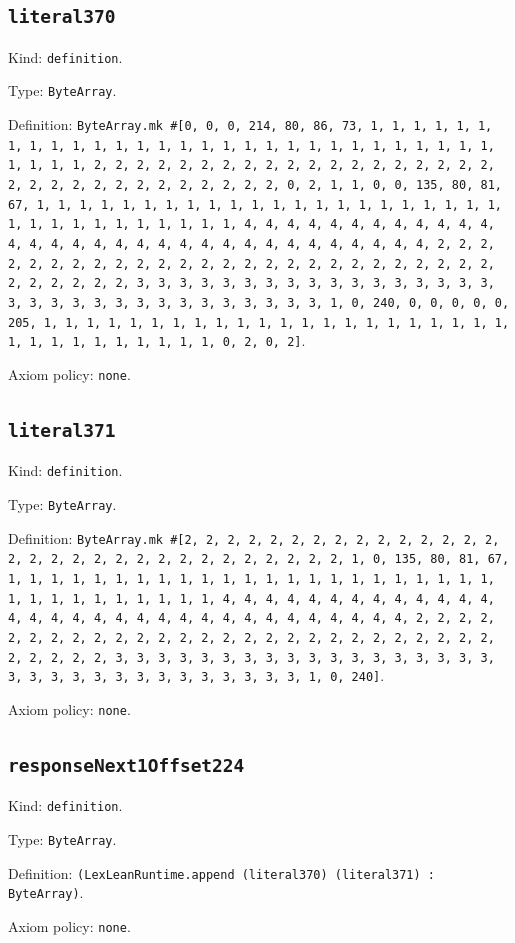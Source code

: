 \documentclass[11pt]{article}
\begin{document}
\subsection*{\texttt{literal370}}
\noindent Kind: \texttt{definition}.\par
\noindent Type: \texttt{ByteArray}.\par
\noindent Definition: \texttt{ByteArray.mk \#[0, 0, 0, 214, 80, 86, 73, 1, 1, 1, 1, 1, 1, 1, 1, 1, 1, 1, 1, 1, 1, 1, 1, 1, 1, 1, 1, 1, 1, 1, 1, 1, 1, 1, 1, 1, 1, 1, 1, 1, 2, 2, 2, 2, 2, 2, 2, 2, 2, 2, 2, 2, 2, 2, 2, 2, 2, 2, 2, 2, 2, 2, 2, 2, 2, 2, 2, 2, 2, 2, 2, 2, 0, 2, 1, 1, 0, 0, 135, 80, 81, 67, 1, 1, 1, 1, 1, 1, 1, 1, 1, 1, 1, 1, 1, 1, 1, 1, 1, 1, 1, 1, 1, 1, 1, 1, 1, 1, 1, 1, 1, 1, 1, 1, 1, 4, 4, 4, 4, 4, 4, 4, 4, 4, 4, 4, 4, 4, 4, 4, 4, 4, 4, 4, 4, 4, 4, 4, 4, 4, 4, 4, 4, 4, 4, 4, 4, 2, 2, 2, 2, 2, 2, 2, 2, 2, 2, 2, 2, 2, 2, 2, 2, 2, 2, 2, 2, 2, 2, 2, 2, 2, 2, 2, 2, 2, 2, 2, 2, 3, 3, 3, 3, 3, 3, 3, 3, 3, 3, 3, 3, 3, 3, 3, 3, 3, 3, 3, 3, 3, 3, 3, 3, 3, 3, 3, 3, 3, 3, 3, 3, 1, 0, 240, 0, 0, 0, 0, 0, 205, 1, 1, 1, 1, 1, 1, 1, 1, 1, 1, 1, 1, 1, 1, 1, 1, 1, 1, 1, 1, 1, 1, 1, 1, 1, 1, 1, 1, 1, 1, 1, 1, 0, 2, 0, 2]}.\par
\noindent Axiom policy: \texttt{none}.\par
\subsection*{\texttt{literal371}}
\noindent Kind: \texttt{definition}.\par
\noindent Type: \texttt{ByteArray}.\par
\noindent Definition: \texttt{ByteArray.mk \#[2, 2, 2, 2, 2, 2, 2, 2, 2, 2, 2, 2, 2, 2, 2, 2, 2, 2, 2, 2, 2, 2, 2, 2, 2, 2, 2, 2, 2, 2, 2, 1, 0, 135, 80, 81, 67, 1, 1, 1, 1, 1, 1, 1, 1, 1, 1, 1, 1, 1, 1, 1, 1, 1, 1, 1, 1, 1, 1, 1, 1, 1, 1, 1, 1, 1, 1, 1, 1, 1, 4, 4, 4, 4, 4, 4, 4, 4, 4, 4, 4, 4, 4, 4, 4, 4, 4, 4, 4, 4, 4, 4, 4, 4, 4, 4, 4, 4, 4, 4, 4, 4, 2, 2, 2, 2, 2, 2, 2, 2, 2, 2, 2, 2, 2, 2, 2, 2, 2, 2, 2, 2, 2, 2, 2, 2, 2, 2, 2, 2, 2, 2, 2, 2, 3, 3, 3, 3, 3, 3, 3, 3, 3, 3, 3, 3, 3, 3, 3, 3, 3, 3, 3, 3, 3, 3, 3, 3, 3, 3, 3, 3, 3, 3, 3, 3, 1, 0, 240]}.\par
\noindent Axiom policy: \texttt{none}.\par
\subsection*{\texttt{responseNext1Offset224}}
\noindent Kind: \texttt{definition}.\par
\noindent Type: \texttt{ByteArray}.\par
\noindent Definition: \texttt{(LexLeanRuntime.append (literal370) (literal371) : ByteArray)}.\par
\noindent Axiom policy: \texttt{none}.\par
\end{document}
